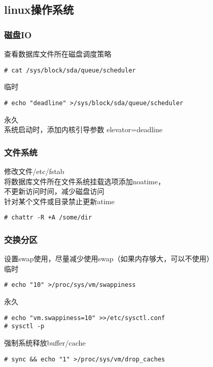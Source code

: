 
\subsection{linux操作系统}
\subsubsection{磁盘IO}
查看数据库文件所在磁盘调度策略
\begin{verbatim}
# cat /sys/block/sda/queue/scheduler
\end{verbatim}
临时
\begin{verbatim}
# echo "deadline" >/sys/block/sda/queue/scheduler
\end{verbatim}
永久 \\
系统启动时，添加内核引导参数 elevator=deadline
\subsubsection{文件系统}
修改文件/etc/fstab \\
将数据库文件所在文件系统挂载选项添加noatime，\\
不更新访问时间，减少磁盘访问 \\
针对某个文件或目录禁止更新atime
\begin{verbatim}
# chattr -R +A /some/dir
\end{verbatim}
\subsubsection{交换分区}
设置swap使用，尽量减少使用swap（如果内存够大，可以不使用）\\
临时
\begin{verbatim}
# echo "10" >/proc/sys/vm/swappiness
\end{verbatim}
永久
\begin{verbatim}
# echo "vm.swappiness=10" >>/etc/sysctl.conf
# sysctl -p
\end{verbatim}
强制系统释放buffer/cache
\begin{verbatim}
# sync && echo "1" >/proc/sys/vm/drop_caches
\end{verbatim}
